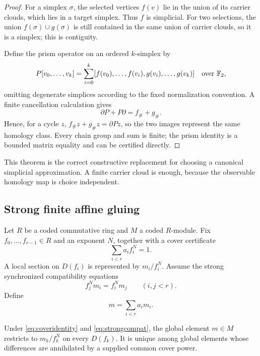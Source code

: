 \begin{proof}
For a simplex \(\sigma\), the selected vertices \(f(v)\) lie in the union of
its carrier clouds, which lies in a target simplex.  Thus \(f\) is simplicial.
For two selections, the union
\(f(\sigma)\cup g(\sigma)\) is still contained in the same union of carrier
clouds, so it is a simplex; this is contiguity.

Define the prism operator on an ordered \(k\)-simplex by
\[
 P[v_0,\ldots,v_k]
 =\sum_{i=0}^k
 [f(v_0),\ldots,f(v_i),g(v_i),\ldots,g(v_k)]
 \quad\text{over }\mathbb F_2,
\]
omitting degenerate simplices according to the fixed normalization convention.
A finite cancellation calculation gives
\[
       \partial P+P\partial=f_\#+g_\#.
\]
Hence, for a cycle \(z\),
\(f_\#z+g_\#z=\partial Pz\), so the two images represent the same homology
class.  Every chain group and sum is finite; the prism identity is a bounded
matrix equality and can be certified directly.
\end{proof}

This theorem is the correct constructive replacement for choosing a canonical
simplicial approximation.  A finite carrier cloud is enough, because the
observable homology map is choice independent.

\subsection{Strong finite affine gluing}

Let \(R\) be a coded commutative ring and \(M\) a coded \(R\)-module.  Fix
\(f_0,\ldots,f_{r-1}\in R\) and an exponent \(N\), together with a cover
certificate
\begin{equation}
        \sum_{i<r} a_i f_i^N=1.
        \label{eq:coveridentity}
\end{equation}
A local section on \(D(f_i)\) is represented by \(m_i/f_i^N\).  Assume the
strong synchronized compatibility equations
\begin{equation}
        f_j^N m_i=f_i^N m_j
        \qquad(i,j<r).
        \label{eq:strongcompat}
\end{equation}
Define
\[
             m=\sum_{i<r}a_i m_i.
\]

\begin{theorem}
Under \eqref{eq:coveridentity} and \eqref{eq:strongcompat}, the global element
\(m\in M\) restricts to \(m_k/f_k^N\) on every \(D(f_k)\).  It is unique among
global elements whose differences are annihilated by a supplied common cover
power.
\end{theorem}

